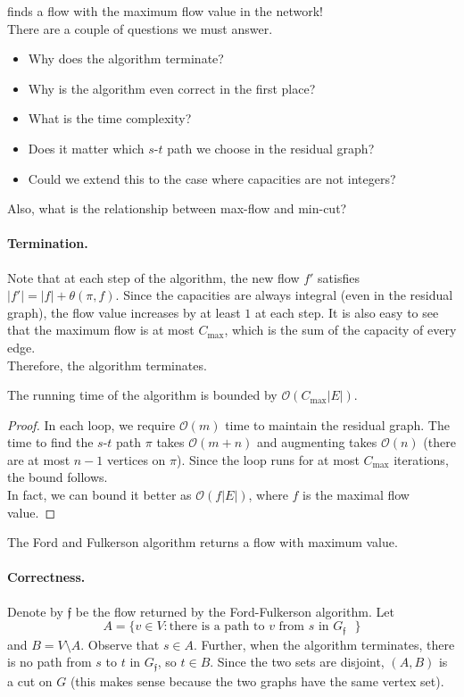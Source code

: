 	 finds a flow with the maximum flow value in the network!\\
	There are a couple of questions we must answer.
	\begin{itemize}
		\item Why does the algorithm terminate?
		\item Why is the algorithm even correct in the first place?
		\item What is the time complexity?
		\item Does it matter which $s$-$t$ path we choose in the residual graph?
		\item Could we extend this to the case where capacities are not integers?
	\end{itemize}

	Also, what is the relationship between max-flow and min-cut?

	\paragraph{Termination.} Note that at each step of the algorithm, the new flow $f'$ satisfies $|f'|=|f|+\theta(\pi,f)$. Since the capacities are always integral (even in the residual graph), the flow value increases by at least $1$ at each step. It is also easy to see that the maximum flow is at most $C_{\text{max}}$, which is the sum of the capacity of every edge.\\
	Therefore, the algorithm terminates.

	\begin{lemma}
		The running time of the algorithm is bounded by $\mathcal{O}(C_{\text{max}}|E|)$.
	\end{lemma}
	\begin{proof}
		In each loop, we require $\mathcal{O}(m)$ time to maintain the residual graph. The time to find the $s$-$t$ path $\pi$ takes $\mathcal{O}(m+n)$ and augmenting takes $\mathcal{O}(n)$ (there are at most $n-1$ vertices on $\pi$). Since the loop runs for at most $C_{\text{max}}$ iterations, the bound follows.\\
		In fact, we can bound it better as $\mathcal{O}(f|E|)$, where $f$ is the maximal flow value.
	\end{proof}

	\begin{lemma}
		The Ford and Fulkerson algorithm returns a flow with maximum value.
	\end{lemma}

	\paragraph{Correctness.} Denote by $\mathfrak{f}$ be the flow returned by the Ford-Fulkerson algorithm. Let
	\[ A = \{v\in V : \text{there is a path to $v$ from $s$ in $G_{\mathfrak{f}}$ }\} \]
	and $B=V\setminus A$. Observe that $s\in A$. Further, when the algorithm terminates, there is no path from $s$ to $t$ in $G_\mathfrak{f}$, so $t\in B$. Since the two sets are disjoint, $(A,B)$ is a cut on $G$ (this makes sense because the two graphs have the same vertex set).

